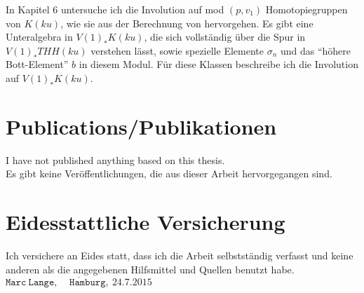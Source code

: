 \documentclass[12pt,bibliography=totoc,final]{scrbook} %
\begin{document}
In Kapitel 6 untersuche ich die Involution auf mod $(p,v_1)$ Homotopiegruppen von $K(ku)$, wie sie aus
der Berechnung von \cite{AuKku} hervorgehen. Es gibt eine Unteralgebra in $V(1)_*K(ku)$, die sich vollst\"andig
\"uber die Spur in $V(1)_*THH(ku)$ verstehen l\"asst, sowie spezielle Elemente $\sigma_n$ und das
``h\"ohere Bott-Element'' $b$ in diesem Modul. F\"ur diese Klassen beschreibe ich die 
Involution auf $V(1)_*K(ku)$.

\newpage
\section*{Publications/Publikationen}
I have not published anything based on this thesis.\\
Es gibt keine Ver\"offentlichungen, die aus dieser Arbeit hervorgegangen sind.

\section*{Eidesstattliche Versicherung} Ich versichere an Eides statt, dass ich die Arbeit selbstst\"andig verfasst und 
keine anderen als die angegebenen Hilfsmittel und Quellen benutzt habe.\\[10ex]\flushright$\overline{\mathtt{Marc~Lange,}~
~~~~ \mathtt{Hamburg, ~24.7.2015}}$
\end{document}

